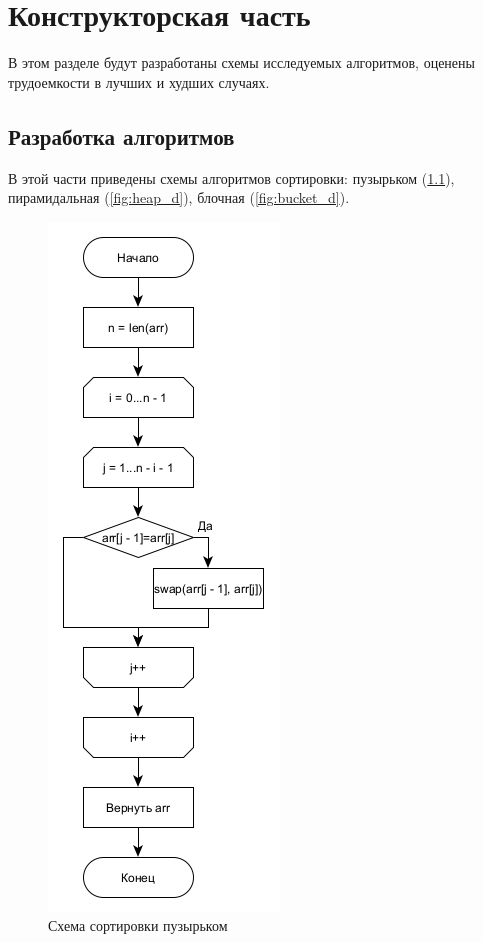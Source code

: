 
\chapter{Конструкторская часть}
В этом разделе будут разработаны схемы исследуемых алгоритмов, оценены трудоемкости в лучших и худших случаях.

\section{Разработка алгоритмов}
В этой части приведены схемы алгоритмов сортировки: пузырьком (\ref{fig:bubble_d}), пирамидальная (\ref{fig:heap_d}), блочная (\ref{fig:bucket_d}).
\begin{figure}[h]
	\centering
	\includegraphics[scale = 0.5]{img/bubble_diag.png}
	\caption{Схема сортировки пузырьком}
	\label{fig:bubble_d}
\end{figure}
